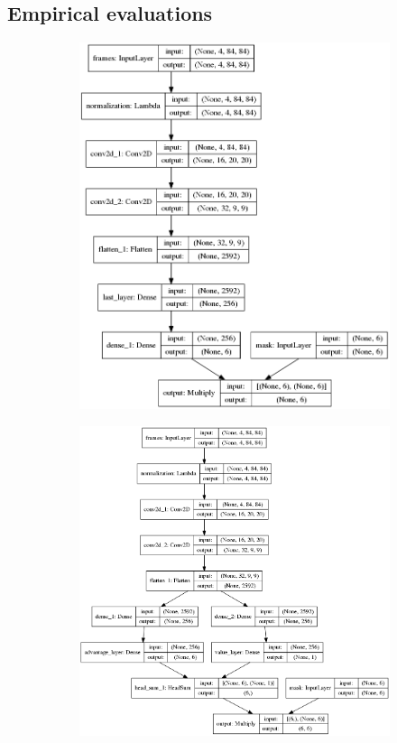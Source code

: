 \documentclass[10pt]{article}
\begin{document}
\begin{multicols}{2}
\section{Empirical evaluations}

\begin{figure}
	\centering
	\begin{subfigure}[b]{0.40\textwidth}
	\centering\includegraphics[width=\linewidth]{model.png}
	\end{subfigure}
	\begin{subfigure}[b]{0.59\textwidth}
	\centering\includegraphics[width=\linewidth]{duel.png}

\end{subfigure}
\end{figure}
\end{multicols}
\end{document}
